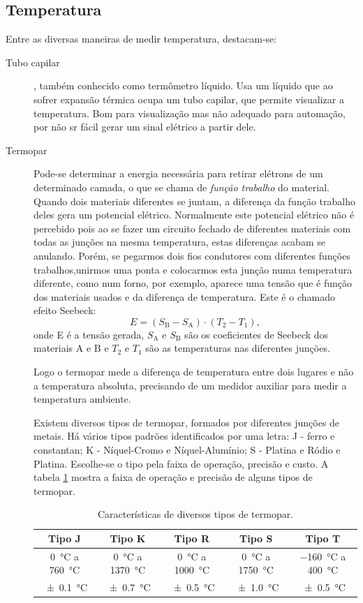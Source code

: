 \subsection{Temperatura}
Entre as diversas maneiras de medir temperatura, destacam-se:
\begin{description}
  \item[Tubo capilar], também conhecido como termômetro líquido. Usa um líquido que ao sofrer expansão térmica ocupa um tubo capilar, que permite visualizar a temperatura. Bom para visualização mas não adequado para automação, por não sr fácil gerar um sinal elétrico a partir dele.

  \item[Termopar] Pode-se determinar a energia necessária para retirar elétrons de um determinado camada, o que se chama de \emph{função trabalho} do material. Quando dois materiais diferentes se juntam, a diferença da função trabalho deles gera um potencial elétrico. Normalmente este potencial elétrico não é percebido pois ao se fazer um circuito fechado de diferentes materiais com todas as junções na mesma temperatura, estas diferenças acabam se anulando. Porém, se pegarmos dois fios condutores com diferentes funções trabalhos,unirmos uma ponta e colocarmos esta junção numa temperatura diferente, como num forno, por exemplo, aparece uma tensão que é função dos materiais usados e da diferença de temperatura. Este é o chamado efeito Seebeck:
  \[
E = (S_\mathrm{B} - S_\mathrm{A}) \cdot (T_2 - T_1),
  \]
  onde E é a tensão gerada, $S_\mathrm{A}$ e $S_\mathrm{B}$ são os coeficientes de Seebeck dos materiais A e B e $T_2$ e $T_1$ são as temperaturas nas diferentes junções.

Logo o termopar mede a diferença de temperatura entre dois lugares e não a temperatura absoluta, precisando de um medidor auxiliar para medir a temperatura ambiente.

Existem diversos tipos de termopar, formados por diferentes junções de metais. Há vários tipos padrões identificados por uma letra: J - ferro e constantan; K - Níquel-Cromo e Níquel-Alumínio; S - Platina e Ródio e Platina. Escolhe-se o tipo pela faixa de operação, precisão e custo. A tabela \ref{tab:termopares} mostra a faixa de operação e precisão de alguns tipos de termopar.

\begin{table}
  \caption{Características de diversos tipos de termopar.}
  \label{tab:termopares}
  \begin{tabular}{ccccc}
    \hline
    Tipo J & Tipo K & Tipo R & Tipo S & Tipo T\\
    \hline
    \SI{0}{\celsius} a \SI{760}{\celsius}  & \SI{0}{\celsius} a \SI{1370}{\celsius} & \SI{0}{\celsius} a \SI{1000}{\celsius} & \SI{0}{\celsius} a \SI{1750}{\celsius} & \SI{-160}{\celsius} a \SI{400}{\celsius} \\
    \SI{\pm 0,1}{\celsius} & \SI{\pm 0,7}{\celsius} &\SI{\pm 0,5}{\celsius} &\SI{\pm 1,0}{\celsius} &\SI{\pm 0,5}{\celsius} \\
    \hline
  \end{tabular}
\end{table}


\end{description}
